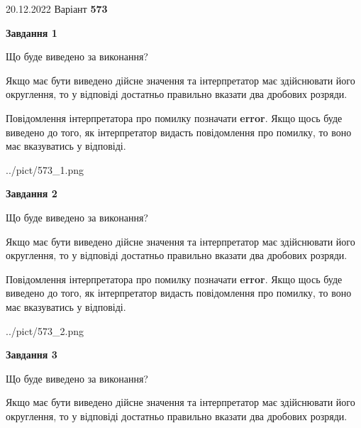 \documentclass[12pt, ukrainian]{article}
\begin{document}
{20.12.2022 Варіант \No \textbf { 573 }\par}
{
\begin {Large}

{\begin {center}\textbf{Завдання 1}\end {center}}\par
Що буде виведено за виконання? \par

Якщо має бути виведено дійсне значення та інтерпретатор має здійснювати його округлення, 
то у відповіді достатньо правильно вказати два дробових розряди.

Повідомлення інтерпретатора про помилку позначати \textbf{error}.
Якщо щось буде виведено до того, як інтерпретатор видасть повідомлення про помилку, 
то воно має вказуватись у відповіді. \par

\begin{center}
	{../pict/573_1.png}
\end{center}
\newpage

{\begin {center}\textbf{Завдання 2}\end {center}}\par
Що буде виведено за виконання? \par

Якщо має бути виведено дійсне значення та інтерпретатор має здійснювати його округлення, 
то у відповіді достатньо правильно вказати два дробових розряди.

Повідомлення інтерпретатора про помилку позначати \textbf{error}.
Якщо щось буде виведено до того, як інтерпретатор видасть повідомлення про помилку, 
то воно має вказуватись у відповіді. \par

\begin{center}
	{../pict/573_2.png}
\end{center}
\newpage

{\begin {center}\textbf{Завдання 3}\end {center}}\par
Що буде виведено за виконання? \par

Якщо має бути виведено дійсне значення та інтерпретатор має здійснювати його округлення, 
то у відповіді достатньо правильно вказати два дробових розряди.


\end{Large}}
\end{document}
